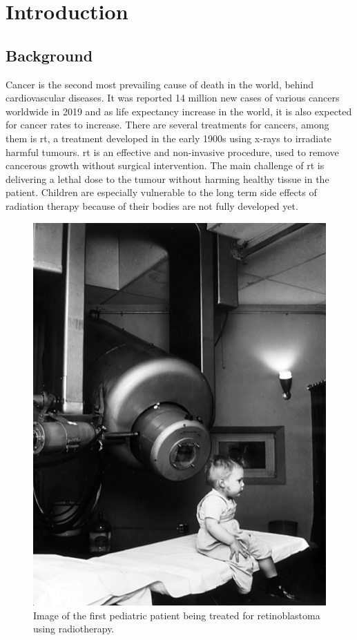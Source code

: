 \documentclass[main.tex]{subfiles}
\begin{document}
\section{Introduction}

\subsection{Background}

Cancer is the second most prevailing cause of death in the world, behind cardiovascular diseases. It was reported 14 million new cases of various cancers worldwide in 2019 \cite{cancer_number} and as life expectancy increase in the world, it is also expected for cancer rates to increase. There are several treatments for cancers, among them is \gls{rt}, a treatment developed in the early 1900s using x-rays to irradiate harmful tumours. \gls{rt} is an effective and non-invasive procedure, used to remove cancerous growth without surgical intervention. The main challenge of \gls{rt} is delivering a lethal dose to the tumour without harming healthy tissue in the patient. Children are especially vulnerable to the long term side effects of radiation therapy because of their bodies are not fully developed yet.

\begin{figure}[!ht]
    \centering
    \includegraphics[scale = 0.4]{images/rt_intro.jpg}
    \caption{Image of the first pediatric patient being treated for retinoblastoma using radiotherapy.\cite{rt_intro}}
    \label{fig: rt_intro}
\end{figure}
\FloatBarrier
\end{document}
